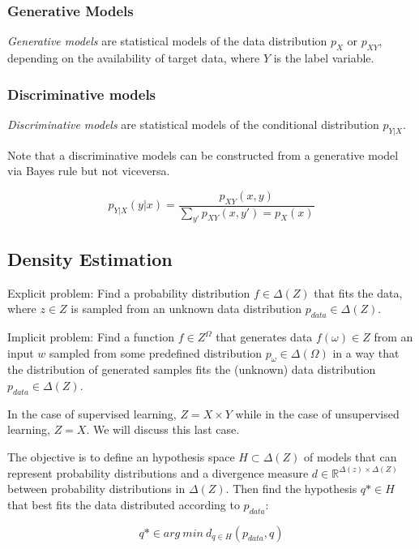 \documentclass{article}
\begin{document}
\subsubsection{Generative Models}\label{generative-models}

\emph{Generative models} are statistical models of the data distribution
\(p_X\) or \(p_{XY}\), depending on the availability of target data,
where \(Y\) is the label variable.

\subsubsection{Discriminative models}\label{discriminative-models}

\emph{Discriminative models} are statistical models of the conditional
distribution \(p_{Y|X}\).

Note that a discriminative models can be constructed from a generative
model via Bayes rule but not viceversa.

\[p_{Y|X}(y|x)=\frac{p_{XY}(x, y)}{\sum_{y'}p_{XY}(x, y') = p_X(x)}\]

\subsection{Density Estimation}\label{density-estimation}

Explicit problem: Find a probability distribution \(f\in \Delta (Z)\)
that fits the data, where \(z\in Z\) is sampled from an unknown data
distribution \(p_{data}\in \Delta (Z)\).

Implicit problem: Find a function \(f\in Z^{\Omega}\) that generates
data \(f(\omega)\in Z\) from an input \(w\) sampled from some predefined
distribution \(p_\omega \in \Delta (\Omega)\) in a way that the
distribution of generated samples fits the (unknown) data distribution
\(p_{data}\in \Delta (Z)\).

In the case of supervised learning, \(Z=X\times Y\) while in the case of
unsupervised learning, \(Z=X\). We will discuss this last case.

The objective is to define an hypothesis space \(H\subset \Delta (Z)\)
of models that can represent probability distributions and a divergence
measure \(d\in \mathbb{R}^{\Delta (z)\times \Delta (Z)}\) between
probability distributions in \(\Delta (Z)\). Then find the hypothesis
\(q*\in H\) that best fits the data distributed according to
\(p_{data}\):

\[q*\in arg\ min\ d_{q\in H}(p_{data}, q)\]
\end{document}
